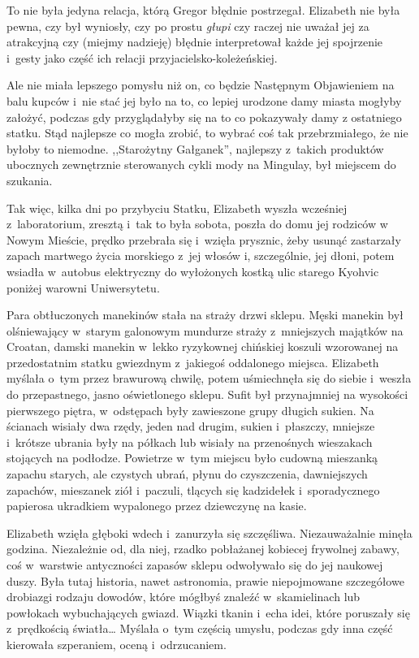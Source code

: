 \documentclass[oneside,polish,12pt,sfheadings]{mwbk}
\begin{document}
To nie była jedyna relacja, którą Gregor błędnie postrzegał. Elizabeth
nie była pewna, czy był wyniosły, czy po prostu \emph{głupi} czy raczej
nie uważał jej za atrakcyjną czy (miejmy nadzieję) błędnie interpretował
każde jej spojrzenie i~gesty jako część ich relacji
przyjacielsko-koleżeńskiej.

Ale nie miała lepszego pomysłu niż on, co będzie Następnym Objawieniem
na balu kupców i~nie stać jej było na to, co lepiej urodzone damy miasta
mogłyby założyć, podczas gdy przyglądałyby się na to co pokazywały damy
z ostatniego statku. Stąd najlepsze co mogła zrobić, to wybrać coś tak
przebrzmiałego, że nie byłoby to niemodne. ,,Starożytny Gałganek'',
najlepszy z~takich produktów ubocznych zewnętrznie sterowanych cykli
mody na Mingulay, był miejscem do szukania.

Tak więc, kilka dni po przybyciu Statku, Elizabeth wyszła wcześniej z~laboratorium, zresztą i~tak to była sobota, poszła do domu jej rodziców
w Nowym Mieście, prędko przebrała się i~wzięła prysznic, żeby usunąć
zastarzały zapach martwego życia morskiego z~jej włosów i, szczególnie,
jej dłoni, potem wsiadła w~autobus elektryczny do wyłożonych kostką ulic
starego Kyohvic poniżej warowni Uniwersytetu.

Para obtłuczonych manekinów stała na straży drzwi sklepu. Męski manekin
był olśniewający w~starym galonowym mundurze straży z~mniejszych
majątków na Croatan, damski manekin w~lekko ryzykownej chińskiej koszuli
wzorowanej na przedostatnim statku gwiezdnym z~jakiegoś oddalonego
miejsca. Elizabeth myślała o~tym przez brawurową chwilę, potem
uśmiechnęła się do siebie i~weszła do przepastnego, jasno oświetlonego
sklepu. Sufit był przynajmniej na wysokości pierwszego piętra, w~odstępach były zawieszone grupy długich sukien. Na ścianach wisiały dwa
rzędy, jeden nad drugim, sukien i~płaszczy, mniejsze i~krótsze ubrania
były na półkach lub wisiały na przenośnych wieszakach stojących na
podłodze. Powietrze w~tym miejscu było cudowną mieszanką zapachu
starych, ale czystych ubrań, płynu do czyszczenia, dawniejszych
zapachów, mieszanek ziół i~paczuli, tlących się kadzidełek i~sporadycznego papierosa ukradkiem wypalonego przez dziewczynę na kasie.

Elizabeth wzięła głęboki wdech i~zanurzyła się szczęśliwa.
Niezauważalnie minęła godzina. Niezależnie od, dla niej, rzadko
pobłażanej kobiecej frywolnej zabawy, coś w~warstwie antyczności zapasów
sklepu odwoływało się do jej naukowej duszy. Była tutaj historia, nawet
astronomia, prawie niepojmowane szczegółowe drobiazgi rodzaju dowodów,
które mógłbyś znaleźć w~skamielinach lub powłokach wybuchających gwiazd.
Wiązki tkanin i~echa idei, które poruszały się z~prędkością światła\ldots
 Myślała o~tym częścią umysłu, podczas gdy inna część kierowała
szperaniem, oceną i~odrzucaniem.
\end{document}
